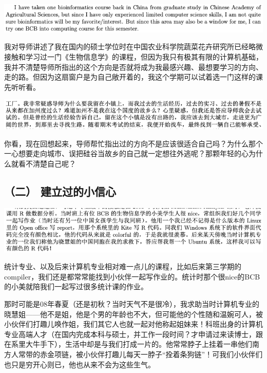 \documentclass[9pt, b5paper]{article}
\begin{document}
\begin{center}
\includegraphics[width=.9\linewidth]{./pic/backups_plans_20210419_085406.png}
\end{center}

我对导师讲述了我在国内的硕士学位时在中国农业科学院蔬菜花卉研究所已经略微接触和学习过一门《生物信息学》的课程，但因为我只有极其有限的计算机基础，我并不清楚导师所指出的这个方向是否就将成为我最感兴趣、最想要学习的方向、走的路。但因为这扇窗户是为自己敞开着的，我这个学期可以试着选一门这样的课先听听看。

\begin{center}
\includegraphics[width=.9\linewidth]{./pic/backups_plans_20210425_095828.png}
\end{center}

你看，现在回想起来，导师帮忙指出过的方向不是应该很适合自己吗？为什么那个一心想要走向城市、误把硅谷当故乡的自己就一定想往外逃呢？那颗年轻的心为什么就看不清楚自己呢？

\subsection{（二） 建立过的小信心}
\label{sec:org51e5919}

\begin{center}
\includegraphics[width=.9\linewidth]{./pic/backups_plans_20210422_090457.png}
\end{center}

统计专业、以及后来计算机专业相对难一点儿的课程，比如后来第三学期的compiler，我们还是都常常能找到小伙伴一起写作业的。统计时那个很nice的BCB的小美就陪我们一起写过很多统计课的作业。

那时可能是08年春夏（还是初秋？当时天气不是很冷），我求助当时计算机专业的晓慧姐——他不是姐，他是个男的年龄也不大，但可能他的个性随和温婉可人，被小伙伴们打趣儿唤作姐，我们其它人也就一起对他称起姐妹来！科班出身的计算机专业高端人才（在国内完成本科与硕士，并工作一段时间？才申请过来读博士，跟在系里大牛手下），生活中却是与我们打成一片的。他常常脖子上挂着一串他们南方人常带的赤金项链，被小伙伴打趣儿每天一脖子“拴着条狗链”！可我们小伙伴们也只是穷开心则已，他也从来不会为这些生气。
\end{document}
